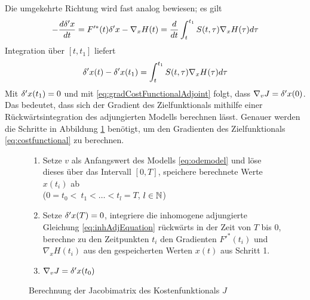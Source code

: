 Die umgekehrte Richtung wird fast analog bewiesen; es gilt
\begin{equation*}
 -\frac{d\delta 'x}{dt} = F'^*(t) \delta'x - \nabla_x H(t)
			 = \frac{d}{dt} \int_t^{t_1} S(t,\tau) \nabla_x H(\tau) d\tau
\end{equation*}
Integration über $[t,t_1]$ liefert
\[
 \delta 'x(t) -  \delta 'x(t_1)  = \int_t^{t_1} S(t,\tau) \nabla_x H(\tau) d\tau
\]
Mit $ \delta 'x(t_1) = 0$ und mit \eqref{eq:gradCostFunctionalAdjoint} folgt, dass $\nabla_v J = \delta'x(0)$. Das bedeutet, dass sich der Gradient des Zielfunktionals mithilfe einer Rückwärtsintegration des adjungierten Modells berechnen lässt.
Genauer werden die Schritte in Abbildung \ref{alg:genCostFunctionalPseudo} benötigt, um den Gradienten des Zielfunktionals \eqref{eq:costfunctional} zu berechnen.
\begin{figure}
\begin{framed}
 \begin{enumerate}
 \item Setze $v$ als Anfangswert des Modells \eqref{eq:odemodel} und löse dieses über das Intervall $[0,T]$, speichere berechnete Werte $x(t_i)$ ab\\
 ($0= t_0<~ t_1<\ldots<t_l=T$, $l\in \mathbb{N}$)
 \item Setze $\delta 'x(T) = 0$, integriere die inhomogene adjungierte Gleichung \eqref{eq:inhAdjEquation} rückwärts in der Zeit von $T$ bis $0$, berechne zu den Zeitpunkten $t_i$ den Gradienten $F'^*(t_i)$ und $\nabla_x H(t_i)$ aus den gespeicherten Werten $x(t)$ aus Schritt 1.
 \item $\nabla_v J = \delta 'x(t_0)$
\end{enumerate}
\end{framed}
\caption{Berechnung der Jacobimatrix des Kostenfunktionals $J$}
\label{alg:genCostFunctionalPseudo}
\end{figure}

% 

